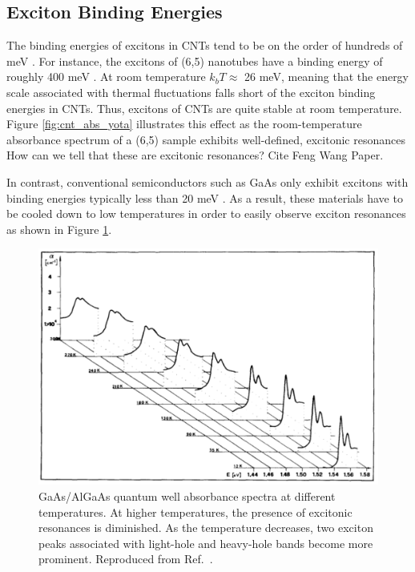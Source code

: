 \subsection{Exciton Binding Energies}

The binding energies of excitons in CNTs tend to be on the order of hundreds of meV \cite{wang2005optical}. For instance, the excitons of (6,5) nanotubes have a binding energy of roughly 400 meV \cite{wang2005optical}. At room temperature $k_b T \approx$ 26 meV, meaning that the energy scale associated with thermal fluctuations falls short of the exciton binding energies in CNTs. Thus, excitons of CNTs are quite stable at room temperature. Figure \ref{fig:cnt_abs_yota} illustrates this effect as the room-temperature absorbance spectrum of a (6,5) sample exhibits well-defined, excitonic resonances {\color{red} How can we tell that these are excitonic resonances? Cite Feng Wang Paper}. 

In contrast, conventional semiconductors such as GaAs only exhibit excitons with binding energies typically less than 20 meV \cite{liang1970excitons}.  As a result, these materials have to be cooled down to low temperatures in order to easily observe exciton resonances as shown in Figure \ref{fig:gaas_vs_cnt_absorbance}. 

\begin{figure}[h]
	\centering
	\includegraphics[scale=0.55]{images/chapter_optical_props/gaas_absorbance_filipowicz}
	\caption{GaAs/AlGaAs quantum well absorbance spectra at different temperatures. At higher temperatures, the presence of excitonic resonances is diminished. As the temperature decreases, two exciton peaks associated with light-hole and heavy-hole bands become more prominent. Reproduced from Ref.\ \cite{filipowicz1990temperature}.}
	\label{fig:gaas_vs_cnt_absorbance}
\end{figure}



